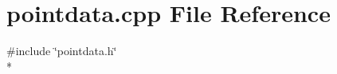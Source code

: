 \section{pointdata.\+cpp File Reference}
\label{curve_2pointdata_8cpp}
{\ttfamily \#include \char`\"{}pointdata.\+h\char`\"{}}\\*
